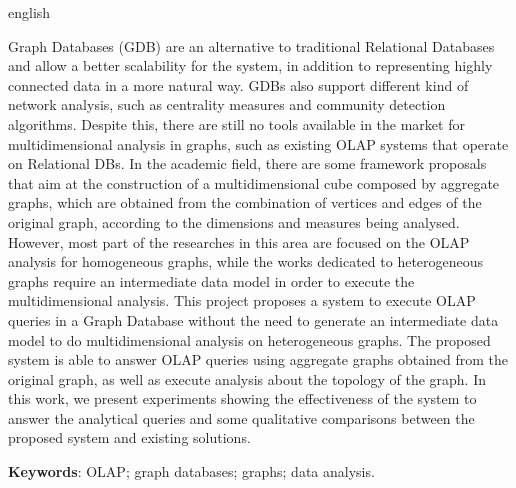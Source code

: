 
\begin{resumo}[Abstract]
\begin{otherlanguage*}{english}

Graph Databases (GDB) are an alternative to traditional Relational Databases and allow a better scalability for the system, in addition to representing highly connected data in a more natural way. GDBs also support different kind of network analysis, such as centrality measures and community detection algorithms. Despite this, there are still no tools available in the market for multidimensional analysis in graphs, such as existing OLAP systems that operate on Relational DBs. In the academic field, there are some framework proposals that aim at the construction of a multidimensional cube composed by aggregate graphs, which are obtained from the combination of vertices and edges of the original graph, according to the dimensions and measures being analysed. However, most part of the researches in this area are focused on the OLAP analysis for homogeneous graphs, while the works dedicated to heterogeneous graphs require an intermediate data model in order to execute the multidimensional analysis. This project proposes a system to execute OLAP queries in a Graph Database without the need to generate an intermediate data model to do multidimensional analysis on heterogeneous graphs. The proposed system is able to answer OLAP queries using aggregate graphs obtained from the original graph, as well as execute analysis about the topology of the graph. In this work, we present experiments showing the effectiveness of the system to answer the analytical queries and some qualitative comparisons between the proposed system and existing solutions.
   \vspace{\onelineskip}

   \noindent
   \textbf{Keywords}: OLAP; graph databases; graphs; data analysis.
 \end{otherlanguage*}
 \end{resumo}


